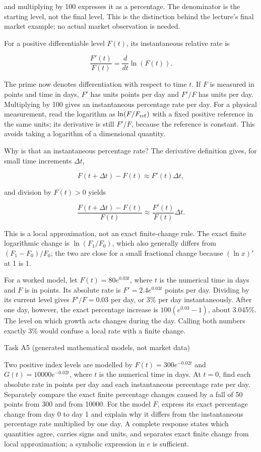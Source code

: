 \documentclass[
  11pt,
]{article}
\begin{document}
and multiplying by 100 expresses it as a percentage. The denominator is
the starting level, not the final level. This is the distinction behind
the lecture's final market example; no actual market observation is
needed.

For a positive differentiable level \(F(t)\), its instantaneous relative
rate is

\[
\frac{F'(t)}{F(t)}=\frac{d}{dt}\ln(F(t)).
\]

The prime now denotes differentiation with respect to time \(t\). If
\(F\) is measured in points and time in days, \(F'\) has units points
per day and \(F'/F\) has units per day. Multiplying by 100 gives an
instantaneous percentage rate per day. For a physical measurement, read
the logarithm as \(\ln(F/F_{\rm ref})\) with a fixed positive reference
in the same units; its derivative is still \(F'/F\), because the
reference is constant. This avoids taking a logarithm of a dimensional
quantity.

Why is that an instantaneous percentage rate? The derivative definition
gives, for small time increments \(\Delta t\),

\[
F(t+\Delta t)-F(t)\approx F'(t)\Delta t,
\]

and division by \(F(t)>0\) yields

\[
\frac{F(t+\Delta t)-F(t)}{F(t)}
\approx\frac{F'(t)}{F(t)}\Delta t.
\]

This is a local approximation, not an exact finite-change rule. The
exact finite logarithmic change is \(\ln(F_1/F_0)\), which also
generally differs from \((F_1-F_0)/F_0\); the two are close for a small
fractional change because \((\ln x)'\) at 1 is 1.

For a worked model, let \(F(t)=80e^{0.03t}\), where \(t\) is the
numerical time in days and \(F\) is in points. Its absolute rate is
\(F'=2.4e^{0.03t}\) points per day. Dividing by its current level gives
\(F'/F=0.03\) per day, or 3\% per day instantaneously. After one day,
however, the exact percentage increase is \(100(e^{0.03}-1)\), about
3.045\%. The level on which growth acts changes during the day. Calling
both numbers exactly 3\% would confuse a local rate with a finite
change.

Task A5 (generated mathematical models, not market data)

Two positive index levels are modelled by \(F(t)=300e^{-0.02t}\) and
\(G(t)=10000e^{-0.02t}\), where \(t\) is the numerical time in days. At
\(t=0\), find each absolute rate in points per day and each
instantaneous percentage rate per day. Separately compare the exact
finite percentage changes caused by a fall of 50 points from 300 and
from 10000. For the model \(F\), express its exact percentage change
from day 0 to day 1 and explain why it differs from the instantaneous
percentage rate multiplied by one day. A complete response states which
quantities agree, carries signs and units, and separates exact finite
change from local approximation; a symbolic expression in \(e\) is
sufficient.
\end{document}
